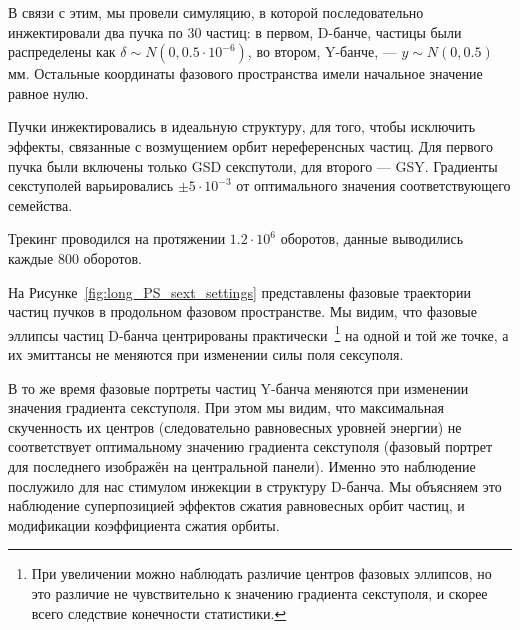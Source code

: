 В связи с этим, мы провели симуляцию, в которой последовательно инжектировали два пучка по 30 частиц: в первом, D-банче, частицы были распределены как $\delta\sim N(0, 0.5\cdot 10^{-6})$, во втором, Y-банче, --- $y\sim N(0, 0.5)$ мм. Остальные координаты фазового пространства имели начальное значение равное нулю. 

Пучки инжектировались в идеальную структуру, для того, чтобы исключить эффекты, связанные с возмущением орбит нереференсных частиц. Для первого пучка были включены только GSD секспутоли, для второго --- GSY. Градиенты секступолей варьировались $\pm 5\cdot 10^{-3}$ от оптимального значения соответствующего семейства.

Трекинг проводился на протяжении $1.2\cdot 10^6$ оборотов, данные выводились каждые 800 оборотов.

На Рисунке~\ref{fig:long_PS_sext_settings} представлены фазовые траектории частиц пучков в продольном фазовом пространстве. Мы видим, что фазовые эллипсы частиц D-банча центрированы практически~\footnote{При увеличении можно наблюдать различие центров фазовых эллипсов, но это различие не чувствительно к значению градиента секступоля, и скорее всего следствие конечности статистики.} на одной и той же точке, а их эмиттансы не меняются при изменении силы поля сексуполя. 

В то же время фазовые портреты частиц Y-банча меняются при изменении значения градиента секступоля. При этом мы видим, что максимальная скученность их центров (следовательно равновесных уровней энергии) не соответствует оптимальному значению градиента секступоля (фазовый портрет для последнего изображён на центральной панели). Именно это наблюдение послужило для нас стимулом инжекции в структуру D-банча. Мы объясняем это наблюдение суперпозицией эффектов сжатия равновесных орбит частиц, и модификации коэффициента сжатия орбиты.

